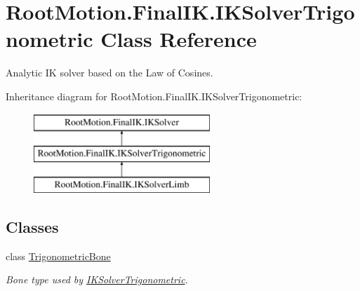 \hypertarget{class_root_motion_1_1_final_i_k_1_1_i_k_solver_trigonometric}{}\section{Root\+Motion.\+Final\+I\+K.\+I\+K\+Solver\+Trigonometric Class Reference}
\label{class_root_motion_1_1_final_i_k_1_1_i_k_solver_trigonometric}


Analytic IK solver based on the Law of Cosines.  


Inheritance diagram for Root\+Motion.\+Final\+I\+K.\+I\+K\+Solver\+Trigonometric\+:\begin{figure}[H]
\begin{center}
\leavevmode
\includegraphics[height=3.000000cm]{class_root_motion_1_1_final_i_k_1_1_i_k_solver_trigonometric}
\end{center}
\end{figure}
\subsection*{Classes}
\begin{DoxyCompactItemize}
\item 
class \mbox{\hyperlink{class_root_motion_1_1_final_i_k_1_1_i_k_solver_trigonometric_1_1_trigonometric_bone}{Trigonometric\+Bone}}
\begin{DoxyCompactList}\small\item\em Bone type used by \mbox{\hyperlink{class_root_motion_1_1_final_i_k_1_1_i_k_solver_trigonometric}{I\+K\+Solver\+Trigonometric}}. \end{DoxyCompactList}\end{DoxyCompactItemize}
